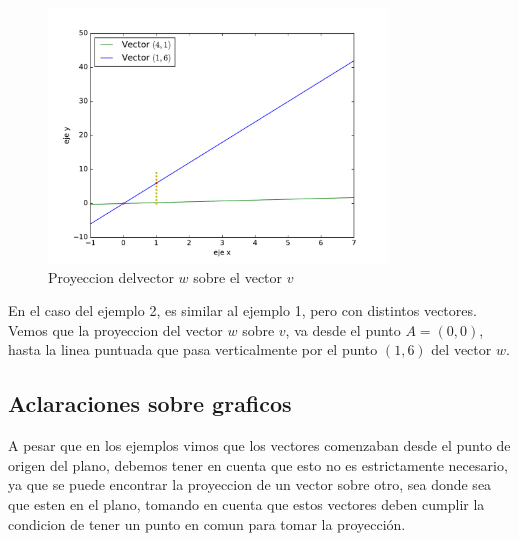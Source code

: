 \documentclass[11pt,spanish,a4paper]{article}
\begin{document}
\begin{enumerate}
\begin{figure}[h]
\begin{center}
\includegraphics[width=9cm]{graf2.pdf}
\caption{Proyeccion delvector $w$ sobre el vector $v$ }\label{plot1}
\end{center}
\end{figure}
\end{enumerate}

En el caso del ejemplo 2, es similar al ejemplo 1, pero con distintos vectores. Vemos que la proyeccion del vector $w$ sobre $v$, va desde el punto $A=(0,0)$, hasta la linea puntuada que pasa verticalmente por el punto $(1,6)$ del vector $w$.



\subsection{Aclaraciones sobre graficos}
A pesar que en los ejemplos vimos que los vectores comenzaban desde el punto de origen del plano, debemos tener en cuenta que esto no es estrictamente necesario, ya que se puede encontrar la proyeccion de un vector sobre otro, sea donde sea que esten en el plano, tomando en cuenta que estos vectores deben cumplir la condicion de tener un punto en comun para tomar la proyección. 

\break
\end{document}
